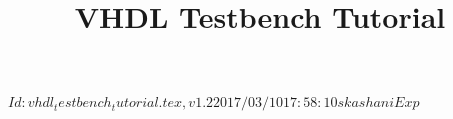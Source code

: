 \documentclass[lab]{course}
\begin{document}
\lstset{language=VHDL}
\lstset{showstringspaces=false}
\lstset{captionpos=b}

\makeatletter
\newenvironment{btHighlight}[1][]
{\begingroup\tikzset{bt@Highlight@par/.style={#1}}\begin{lrbox}{\@tempboxa}}
{\end{lrbox}\bt@HL@box[bt@Highlight@par]{\@tempboxa}\endgroup}

\newcommand\btHL[1][]{%
  \begin{btHighlight}[#1]\bgroup\aftergroup\bt@HL@endenv%
}
\def\bt@HL@endenv{%
  \end{btHighlight}%
  \egroup
}
\newcommand{\bt@HL@box}[2][]{%
  \tikz[#1]{%
    \pgfpathrectangle{\pgfpoint{1pt}{0pt}}{\pgfpoint{\wd #2}{\ht #2}}%
    \pgfusepath{use as bounding box}%
    \node[anchor=base west, fill=orange!30,outer sep=0pt,inner xsep=1pt, inner ysep=0pt, rounded corners=3pt, minimum height=\ht\strutbox+1pt,#1]{\raisebox{1pt}{\strut}\strut\usebox{#2}};
  }%
}
\makeatother

\setlength\parindent{0pt}

\rcsInfo $Id: vhdl_testbench_tutorial.tex,v 1.2 2017/03/10 17:58:10 skashani Exp $

\title{%
  VHDL Testbench Tutorial}
\subtitle{%
  }
\maketitle

\sloppy %

\end{document}
